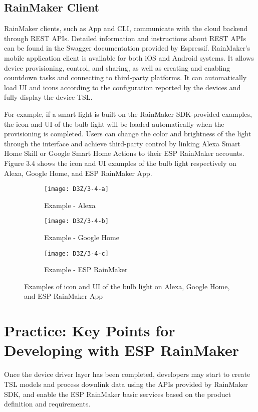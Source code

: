 \documentclass[a4paper,12pt]{book}
\begin{document}
\subsection{RainMaker Client}
RainMaker clients, such as App and CLI, communicate with the cloud backend through REST APIs. Detailed information and instructions about REST APIs can be found in the Swagger documentation provided by Espressif. RainMaker's mobile application client is available for both iOS and Android systems. It allows device provisioning, control, and sharing, as well as creating and enabling countdown tasks and connecting to third-party platforms. It can automatically load UI and icons according to the configuration reported by the devices and fully display the device TSL.

For example, if a smart light is built on the RainMaker SDK-provided examples, the icon and UI of the bulb light will be loaded automatically when the provisioning is completed. Users can change the color and brightness of the light through the interface and achieve third-party control by linking Alexa Smart Home Skill or Google Smart Home Actions to their ESP RainMaker accounts. Figure 3.4 shows the icon and UI examples of the bulb light respectively on Alexa, Google Home, and ESP RainMaker App.

\newpage
\begin{figure}[h!]
\Centering
\begin{subfigure}{0.45\textwidth}
\texttt{[image: D3Z/3-4-a]} 
\caption{Example - Alexa}
\end{subfigure}\hspace{1em}
\begin{subfigure}{0.5\textwidth}
\texttt{[image: D3Z/3-4-b]}
\caption{Example - Google Home}
\end{subfigure}

\vspace{6pt}
\begin{subfigure}{0.55\textwidth}
\texttt{[image: D3Z/3-4-c]}
\caption{Example - ESP RainMaker}
\end{subfigure}
\caption{\Centering Examples of icon and UI of the bulb light on Alexa, Google Home, and ESP RainMaker App}
\end{figure}

\section{Practice: Key Points for Developing with ESP RainMaker}
Once the device driver layer has been completed, developers may start to create TSL models and process downlink data using the APIs provided by RainMaker SDK, and enable the ESP RainMaker basic services based on the product definition and requirements.
\end{document}

